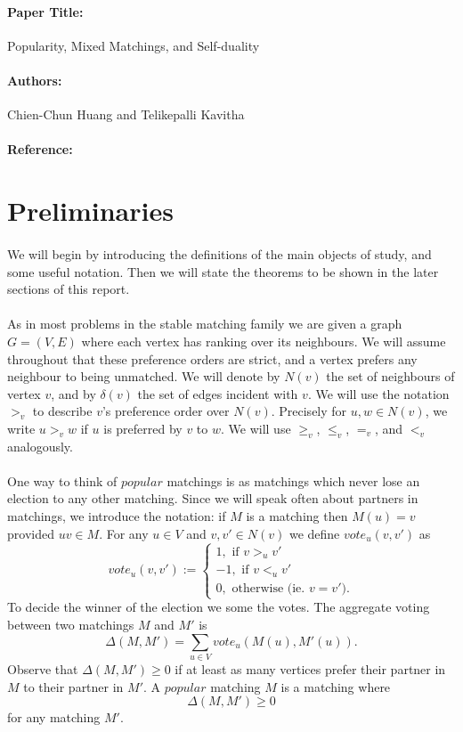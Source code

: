 \documentclass[letterpaper,12pt,oneside,onecolumn]{article}
\begin{document}
\paragraph{Paper Title:} Popularity, Mixed Matchings, and Self-duality
\paragraph{Authors:} Chien-Chun Huang and Telikepalli Kavitha
\paragraph{Reference:} \cite{huang2017popularity}

\section{Preliminaries}
\paragraph{}
We will begin by introducing the definitions of the main objects of study, and some useful notation. Then we will state the theorems to be shown in the later sections of this report.
\paragraph{}
As in most problems in the stable matching family we are given a graph $G=(V,E)$ where each vertex has ranking over its neighbours. We will assume throughout that these preference orders are strict, and a vertex prefers any neighbour to being unmatched. We will denote by $N(v)$ the set of neighbours of vertex $v$, and by $\delta(v)$ the set of edges incident with $v$. We will use the notation $>_v$ to describe $v$'s preference order over $N(v)$. Precisely for $u, w \in N(v)$, we write $u >_v w$ if $u$ is preferred by $v$ to $w$. We will use $\geq_v$, $\leq_v$, $=_v$, and $<_v$ analogously.
\paragraph{}
One way to think of $\textit{popular}$ matchings is as matchings which never lose an election to any other matching. Since we will speak often about partners in matchings, we introduce the notation: if $M$ is a matching then $M(u) = v$ provided $uv \in M$. For any $u \in V$ and $v,v' \in N(v)$ we define $vote_u(v,v')$ as
$$vote_u(v,v') := \begin{cases}
1, \text{ if } v >_u v' \\
-1, \text{ if } v <_u v' \\
0, \text{ otherwise (ie. } v = v').
\end{cases}$$
To decide the winner of the election we some the votes. The aggregate voting between two matchings $M$ and $M'$ is
$$\Delta(M, M') = \sum_{u \in V} vote_u(M(u), M'(u)).$$
Observe that $\Delta(M,M') \geq 0$ if at least as many vertices prefer their partner in $M$ to their partner in $M'$. A $\textit{popular}$ matching $M$ is  a matching where
$$\Delta(M, M') \geq 0$$
for any matching $M'$.
\end{document}
